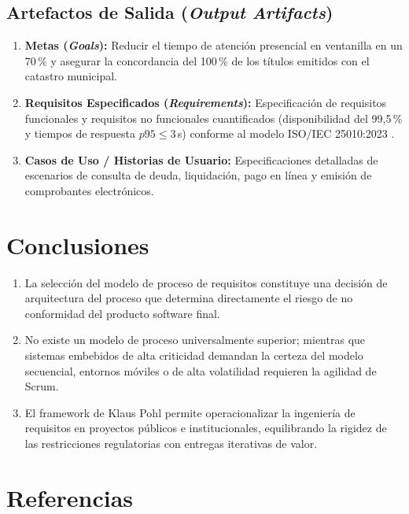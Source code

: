 \documentclass[conference]{IEEEtran}
\begin{document}
	\subsection{Artefactos de Salida (\emph{Output Artifacts})}
	\begin{enumerate}
		\item \textbf{Metas (\emph{Goals}):} Reducir el tiempo de atención presencial en ventanilla en un 70\,\% y asegurar la concordancia del 100\,\% de los títulos emitidos con el catastro municipal.
		\item \textbf{Requisitos Especificados (\emph{Requirements}):} Especificación de requisitos funcionales y requisitos no funcionales cuantificados (disponibilidad del 99,5\,\% y tiempos de respuesta $p95 \le 3$\,s) conforme al modelo ISO/IEC 25010:2023 \cite{iso25010}.
		\item \textbf{Casos de Uso / Historias de Usuario:} Especificaciones detalladas de escenarios de consulta de deuda, liquidación, pago en línea y emisión de comprobantes electrónicos.
	\end{enumerate}
	
	\section{Conclusiones}
	\begin{enumerate}
		\item La selección del modelo de proceso de requisitos constituye una decisión de arquitectura del proceso que determina directamente el riesgo de no conformidad del producto software final.
		\item No existe un modelo de proceso universalmente superior; mientras que sistemas embebidos de alta criticidad demandan la certeza del modelo secuencial, entornos móviles o de alta volatilidad requieren la agilidad de Scrum.
		\item El framework de Klaus Pohl permite operacionalizar la ingeniería de requisitos en proyectos públicos e institucionales, equilibrando la rigidez de las restricciones regulatorias con entregas iterativas de valor.
	\end{enumerate}
	
	\section{Referencias}
	\printbibliography[heading=none]
	
\end{document}
